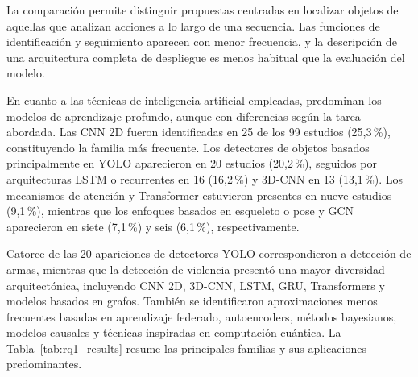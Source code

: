 \documentclass[pdflatex,sn-mathphys-num]{sn-jnl}%
\theoremstyle{thmstyleone}%
\theoremstyle{thmstyletwo}%
\theoremstyle{thmstylethree}%
\begin{document}
\normalsize
\setlength{\tabcolsep}{6pt}
\endgroup

La comparación permite distinguir propuestas centradas en localizar objetos de
aquellas que analizan acciones a lo largo de una secuencia. Las funciones de
identificación y seguimiento aparecen con menor frecuencia, y la descripción de
una arquitectura completa de despliegue es menos habitual que la evaluación del modelo.

En cuanto a las técnicas de inteligencia artificial empleadas, predominan los modelos de aprendizaje profundo,
aunque con diferencias según la tarea abordada. Las CNN 2D fueron identificadas
en 25 de los 99 estudios (25,3\,\%), constituyendo la familia más frecuente.
Los detectores de objetos basados principalmente en YOLO aparecieron en 20 estudios
(20,2\,\%), seguidos por arquitecturas LSTM o recurrentes en 16 (16,2\,\%) y
3D-CNN en 13 (13,1\,\%). Los mecanismos de atención y Transformer estuvieron
presentes en nueve estudios (9,1\,\%), mientras que los enfoques basados en
esqueleto o pose y GCN aparecieron en siete (7,1\,\%) y seis (6,1\,\%),
respectivamente.

Catorce de las 20 apariciones de detectores YOLO correspondieron a detección de armas, mientras que la detección de violencia presentó una
mayor diversidad arquitectónica, incluyendo CNN 2D, 3D-CNN, LSTM, GRU,
Transformers y modelos basados en grafos. También se identificaron aproximaciones
menos frecuentes basadas en aprendizaje federado, autoencoders, métodos bayesianos,
modelos causales y técnicas inspiradas en computación cuántica.
La Tabla~\ref{tab:rq1_results} resume las principales familias y sus aplicaciones predominantes.
\end{document}
